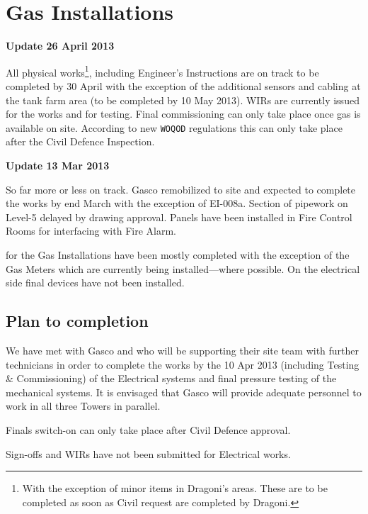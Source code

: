 \chapter{Gas Installations}
\begin{update}
\centerline{\textbf{Update 26 April 2013}}
All physical works\footnote{With the exception of minor items in Dragoni's areas. These are to be completed as soon as Civil request are completed by Dragoni.}, including Engineer's Instructions are on track to be completed by 30 April with the exception of the additional sensors and cabling at the tank farm area (to be completed by 10 May 2013). WIRs are currently issued for the works and for testing. Final commissioning can only take place once gas is available on site. According to new \texttt{WOQOD} regulations this can only take place after the Civil Defence Inspection.
\end{update}


\begin{update}
\centerline{\textbf{Update 13 Mar 2013}}
So far more or less on track. Gasco remobilized to site and expected to complete the works by end March with the exception of EI-008a. Section of pipework on Level-5 delayed by drawing approval. Panels
have been installed in Fire Control Rooms for interfacing with Fire Alarm.
\end{update}

 for the Gas Installations have been mostly completed with the exception of the Gas Meters which are currently being installed---where possible. On the electrical side final devices have not been installed. 

\section{Plan to completion}

We have met with Gasco and who will be supporting their site team with further technicians in order to complete the works by the 10 Apr 2013 (including Testing \& Commissioning) of the Electrical systems and final pressure testing of the mechanical systems. It is envisaged that Gasco will provide adequate personnel to
work in all three Towers in parallel.

Finals switch-on can only take place after Civil Defence approval.

Sign-offs and WIRs have not been submitted for Electrical works.
\vspace*{1.5cm}

